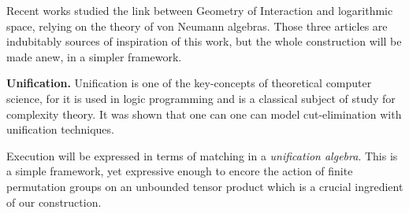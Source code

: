 Recent works \cite{girard_normativity_2012,aubert_characterizing_2012,seiller_logarithmic_2013} studied the link between Geometry of Interaction and logarithmic space, relying on the theory of von Neumann algebras.
Those three articles are indubitably sources of inspiration of this work, but the whole construction will be made anew, in a simpler framework.
%

\smallskip\noindent
\textbf{Unification.} 
Unification is one of the key-concepts of theoretical computer science, for it is used in logic programming and is a classical subject of study for complexity theory.
It was shown \cite{girard_geometry_1995,girard_three_lightings} that one can one can model \hbox{cut-elimination} with unification techniques.
%

Execution will be expressed in terms of matching in a \emph{unification algebra}. This is a simple framework, yet expressive enough to encore the action of finite permutation groups on an unbounded tensor product which is a crucial ingredient of our construction.
%

